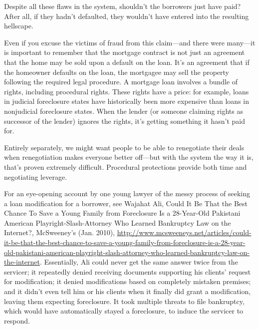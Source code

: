 Despite all these flaws in the system, shouldn't the borrowers just have paid?
After all, if they hadn't defaulted, they wouldn't have entered into the
resulting hellscape. 

Even if you excuse the victims of fraud from this claim---and there were
many---it is important to remember that the mortgage contract is not just an
agreement that the home may be sold upon a default on the loan. It's an
agreement that if the homeowner defaults on the loan, the mortgagee may sell
the property following the required legal procedure. A mortgage loan involves a
bundle of rights, including procedural rights. These rights have a price: for
example, loans in judicial foreclosure states have historically been more
expensive than loans in nonjudicial foreclosure states. When the lender (or
someone claiming rights as successor of the lender) ignores the rights, it's
getting something it hasn't paid for.

Entirely separately, we might want people to be able to renegotiate their deals
when renegotiation makes everyone better off---but with the system the way it
is, that's proven extremely difficult. Procedural protections provide both
time and negotiating leverage.

For an eye-opening account by one young lawyer of the messy process of seeking a
loan modification for a borrower, see Wajahat Ali,
Could
It Be That the Best Chance To Save a Young Family from Foreclosure Is a
28-Year-Old Pakistani American Playright-Slash-Attorney Who Learned Bankruptcy
Law on the Internet?, McSweeney's (Jan. 2010),
\url{http://www.mcsweeneys.net/articles/could-it-be-that-the-best-chance-to-save-a-young-family-from-foreclosure-is-a-28-year-old-pakistani-american-playright-slash-attorney-who-learned-bankruptcy-law-on-the-internet}.
Essentially, Ali could never get the same answer twice from the servicer; it
repeatedly denied receiving documents supporting his clients' request for
modification; it denied modifications based on completely mistaken premises;
and it didn't even tell him or his clients when it finally did grant a
modification, leaving them expecting foreclosure. It took multiple threats to
file bankruptcy, which would have automatically stayed a foreclosure, to induce
the servicer to respond.

